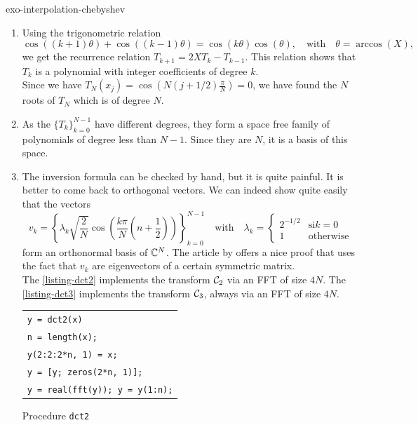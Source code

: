 
\begin{correction}{exo-interpolation-chebyshev}
\begin{enumerate}
\item Using the trigonometric relation
\begin{equation*}
\cos((k+1) \theta) + \cos((k-1) \theta) = \cos(k \theta) \cos(\theta), \quad \text{with} \quad \theta = \arccos(X),
\end{equation*}
we get the recurrence relation $ T_{k+1} = 2 X T_{k} - T_{k-1} $. This relation shows that $ T_k $ is a polynomial with integer coefficients of degree $ k $. \\Since we have $ T_N(x_j) = \cos \left(N(j+1/2) \frac{\pi}{N} \right) = 0 $, we have found the $ N $ roots of $ T_N $ which is of degree $ N $.
\item As the $ \{T_k\}_{k = 0}^{N-1} $ have different degrees, they form a space free family of polynomials of degree less than $ N-1 $. Since they are $ N $, it is a basis of this space.
\item {} The inversion formula can be checked by hand, but it is quite painful. It is better to come back to orthogonal vectors. We can indeed show quite easily that the vectors
\begin{equation*}
v_k = \left\{\lambda_k \sqrt{\frac{2}{N}} \cos \left(\frac{k \pi}{N} \left(n + \frac{1}{2} \right) \right) \right\}_{k = 0}^{N-1} \quad \text{with} \quad \lambda_k = \left\{\begin{array}{ll} 2^{- 1/2} & \text{si} k = 0 \\1 & \text{otherwise} \end{array} \right.
\end{equation*}
form an orthonormal basis of $ \mathbb{C}^N $. The article by  offers a nice proof that uses the fact that $ v_k $ are eigenvectors of a certain symmetric matrix. \\The \listingterme{} \Matlab{} \ref{listing-dct2} implements the transform $ \mathcal{C}_2 $ via an FFT of size $ 4N $. The \listingterme{} \ref{listing-dct3} implements the transform $ \mathcal{C}_3 $, always via an FFT of size $ 4N $.

\begin{listing} 
\begin{footnotesize} 
{\upshape
\begin{tabular}{l} \texttt{\pfunction y = dct2(x)} \\
\texttt{n = length(x);} \\
\texttt{y(2:2:2*n, 1) = x;} \\
\texttt{y = [y; zeros(2*n, 1)];} \\
\texttt{y = real(fft(y)); y = y(1:n);} \\
\end{tabular}
}
\end{footnotesize}
\caption{Procedure \texttt{\upshape dct2}}
\label{listing-dct2}
\end{listing}


\end{enumerate}
\end{correction}
